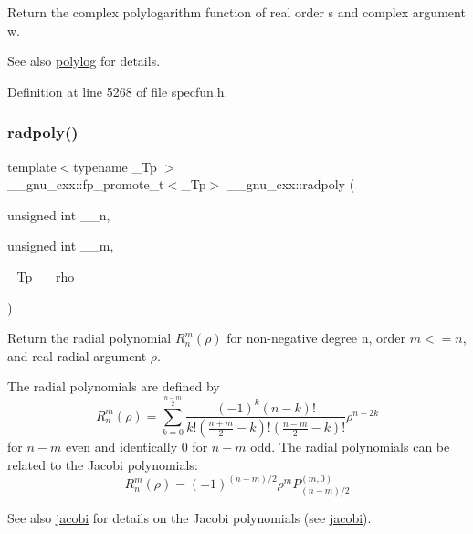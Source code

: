 Return the complex polylogarithm function of real order {\ttfamily s} and complex argument {\ttfamily w}.

\begin{DoxySeeAlso}{See also}
\hyperlink{group__mathsf__gnu_gabcc5480ad739561c2debd6a8a352084f}{polylog} for details. 
\end{DoxySeeAlso}


Definition at line 5268 of file specfun.\+h.

\mbox{\label{group__mathsf__gnu_ga195db2592888b7a8df870d9eaeff8d05}} 
\subsubsection{\texorpdfstring{radpoly()}{radpoly()}}
{\footnotesize\ttfamily template$<$typename \+\_\+\+Tp $>$ \\
\+\_\+\+\_\+gnu\+\_\+cxx\+::fp\+\_\+promote\+\_\+t$<$\+\_\+\+Tp$>$ \+\_\+\+\_\+gnu\+\_\+cxx\+::radpoly (\begin{DoxyParamCaption}\item[{unsigned int}]{\+\_\+\+\_\+n,  }\item[{unsigned int}]{\+\_\+\+\_\+m,  }\item[{\+\_\+\+Tp}]{\+\_\+\+\_\+rho }\end{DoxyParamCaption})\hspace{0.3cm}{\ttfamily [inline]}}

Return the radial polynomial $ R_n^m(\rho) $ for non-\/negative degree {\ttfamily n}, order $ m <= n $, and real radial argument $ \rho $.

The radial polynomials are defined by \[ R_n^m(\rho) = \sum_{k=0}^{\frac{n-m}{2}} \frac{(-1)^k(n-k)!}{k!(\frac{n+m}{2}-k)!(\frac{n-m}{2}-k)!} \rho^{n-2k} \] for $ n - m $ even and identically 0 for $ n - m $ odd. The radial polynomials can be related to the Jacobi polynomials\+: \[ R_n^m(\rho) = (-1)^{(n-m)/2} \rho^m P_{(n-m)/2}^{(m,0)} \] \begin{DoxySeeAlso}{See also}
\hyperlink{group__mathsf__gnu_gad54f6601748324d268532138eb38ca33}{jacobi} for details on the Jacobi polynomials (see \hyperlink{group__mathsf__gnu_gad54f6601748324d268532138eb38ca33}{jacobi}).
\end{DoxySeeAlso}

